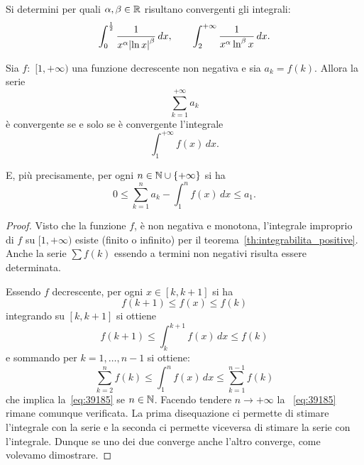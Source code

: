 \begin{exercise}
Si determini per quali $\alpha,\beta\in \mathbb R$ risultano convergenti
gli integrali:
\[
  \int_0^{\frac 1 2} \frac{1}{x^\alpha {\left|\ln x\right|}^\beta}\, dx,
  \qquad
  \int_2^{+\infty} \frac{1}{x^\alpha \ln^\beta x} \, dx.
\]
\end{exercise}

\begin{theorem}
\mymark{**}
Sia $f\colon$ $[1,+\infty)$ una funzione decrescente non negativa
e sia $a_k=f(k)$.
Allora la serie
\[
   \sum_{k=1}^{+\infty} a_k
\]
è convergente se e solo se è convergente l'integrale
\[
  \int_1^{+\infty} f(x)\, dx.
\]

E, più precisamente, per ogni $n\in \mathbb N\cup{\left\{ +\infty \right\}}$ si ha
\begin{equation}\label{eq:39185}
  0
  \le \sum_{k=1}^{n} a_k - \int_1^{n}f(x)\, dx
  \le a_1.
\end{equation}

\end{theorem}
%
\begin{proof}
\mymark{**}
Visto che la funzione $f$, è non negativa e monotona,
l'integrale improprio di $f$ su $[1,+\infty)$ esiste (finito o infinito)
per il teorema~\ref{th:integrabilita_positive}.
Anche la serie $\sum f(k)$ essendo a termini non negativi risulta essere determinata.

Essendo $f$ decrescente, per ogni $x \in [k,k+1]$ si ha
\[
  f(k+1) \le f(x) \le f(k)
\]
integrando su $[k,k+1]$ si ottiene
\[
  f(k+1) \le \int_{k}^{k+1} f(x)\, dx \le f(k)
\]
e sommando per $k=1,\dots, n-1$ si ottiene:
\[
  \sum_{k=2}^{n} f(k) \le \int_{1}^{n} f(x)\, dx \le \sum_{k=1}^{n-1} f(k)
\]
che implica la~\eqref{eq:39185} se $n\in \mathbb N$. Facendo
tendere $n\to+\infty$ la ~\eqref{eq:39185} rimane comunque verificata.
La prima disequazione ci permette di stimare l'integrale con la serie
e la seconda ci permette viceversa di stimare la serie con l'integrale.
Dunque se uno dei due converge anche l'altro converge, come volevamo dimostrare.
\end{proof}

